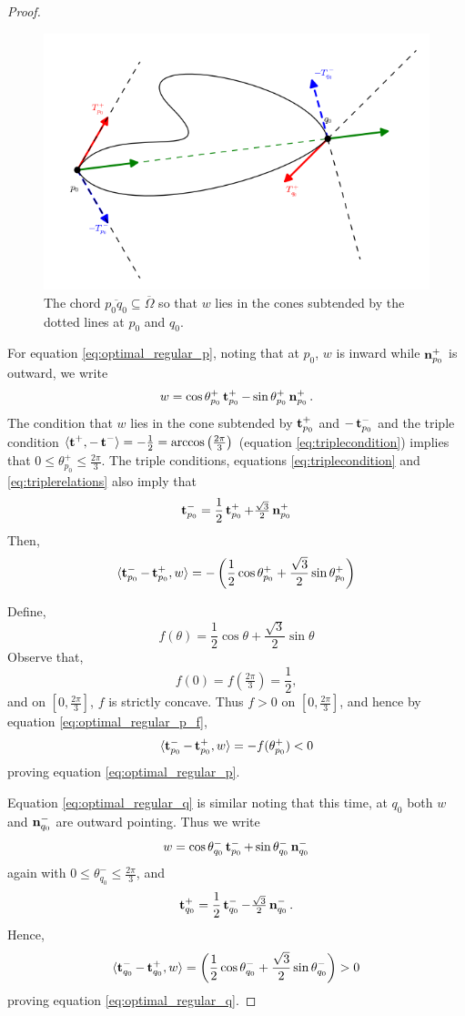 \documentclass[12pt]{amsart}
\begin{document}
\begin{proof}
\begin{figure}[htb]
\centering
\includegraphics[width=.9\linewidth]{optimal_smooth}
\caption{The chord $\overline{p_0q_0} \subseteq \overline{\Omega}$ so that $w$ lies in the cones subtended by the dotted lines at $p_0$ and $q_0$.}
\label{fg:optimal_smooth}
\end{figure}

For equation \eqref{eq:optimal_regular_p}, noting that at \(p_0\), \(w\) is inward while \(\operatorname{\mathbf{n}}_{p_0}^+\) is outward, we write
\[
w = \cos \theta_{p_0}^+ \operatorname{\mathbf{t}}_{p_0}^+ - \sin \theta_{p_0}^+ \operatorname{\mathbf{n}}^+_{p_0}.
\]
The condition that \(w\) lies in the cone subtended by \(\operatorname{\mathbf{t}}_{p_0}^+\) and \(-\operatorname{\mathbf{t}}_{p_0}^-\) and the triple condition $\langle{\operatorname{\mathbf{t}}^+},{-\operatorname{\mathbf{t}}^-}\rangle = -\tfrac{1}{2} = \arccos\left(\tfrac{2\pi}{3}\right)$ (equation \eqref{eq:triplecondition}) implies that $0 \leq \theta^+_{p_0} \leq \tfrac{2\pi}{3}$. The triple conditions, equations \eqref{eq:triplecondition} and \eqref{eq:triplerelations} also imply that
\[
\operatorname{\mathbf{t}}_{p_0}^- = \frac{1}{2} \operatorname{\mathbf{t}}_{p_0}^+ + \tfrac{\sqrt{3}}{2} \operatorname{\mathbf{n}}_{p_0}^+
\]
Then,
\begin{equation}
\label{eq:optimal_regular_p_f}
\langle{\operatorname{\mathbf{t}}_{p_0}^- - \operatorname{\mathbf{t}}_{p_0}^+},{w}\rangle = - \left(\frac{1}{2} \cos \theta_{p_0}^+ + \frac{\sqrt{3}}{2} \sin \theta_{p_0}^+\right)
\end{equation}

Define,
\[
f(\theta) = \frac{1}{2} \cos \theta + \frac{\sqrt{3}}{2} \sin\theta
\]
Observe that,
\[
f(0) = f \left(\tfrac{2\pi}{3}\right) = \frac{1}{2},
\]
and on $[0, \tfrac{2\pi}{3}]$, $f$ is strictly concave. Thus $f > 0$ on $[0, \tfrac{2\pi}{3}]$, and hence by equation \eqref{eq:optimal_regular_p_f},
\[
\langle{\operatorname{\mathbf{t}}_{p_0}^- - \operatorname{\mathbf{t}}_{p_0}^+},{w}\rangle = - f (\theta_{p_0}^+) < 0
\]
proving equation \eqref{eq:optimal_regular_p}.

Equation \eqref{eq:optimal_regular_q} is similar noting that this time, at \(q_0\) both \(w\) and \(\operatorname{\mathbf{n}}_{q_0}^-\) are  outward pointing. Thus we write
\[
w = \cos \theta_{q_0}^- \operatorname{\mathbf{t}}_{p_0}^- + \sin \theta_{q_0}^- \operatorname{\mathbf{n}}^-_{q_0}
\]
again with $0 \leq \theta^-_{q_0} \leq \tfrac{2\pi}{3}$, and
\[
\operatorname{\mathbf{t}}_{q_0}^+ = \frac{1}{2} \operatorname{\mathbf{t}}_{q_0}^- - \tfrac{\sqrt{3}}{2} \operatorname{\mathbf{n}}_{q_0}^-.
\]
Hence,
\[
\langle{\operatorname{\mathbf{t}}_{q_0}^- - \operatorname{\mathbf{t}}_{q_0}^+},{w}\rangle = \left(\frac{1}{2} \cos \theta_{q_0}^- + \frac{\sqrt{3}}{2} \sin \theta_{q_0}^-\right) > 0
\]
proving equation \eqref{eq:optimal_regular_q}.
\end{proof}
\end{document}
